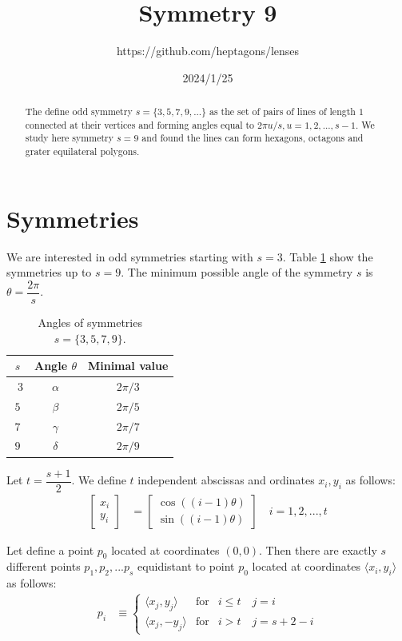 \documentclass[11pt]{article}
\title{Symmetry 9}
\author{https://github.com/heptagons/lenses}
\date{2024/1/25}
\begin{document}
\maketitle
\begin{abstract}
The define odd symmetry $s=\{ 3,5,7,9,... \}$ as the set of pairs of lines of length $1$ connected at their vertices and forming angles equal to $2\pi u/s, u = 1,2,...,s-1$. We study here symmetry $s=9$ and found the lines can form hexagons, octagons and grater equilateral polygons.
\end{abstract}

\section{Symmetries}

We are interested in odd symmetries starting with $s=3$. Table \ref{tbl:symm} show the symmetries up to $s=9$. The minimum possible angle of the symmetry $s$ is $\theta = \dfrac{2\pi}s$. 

\begin{table}[H]
\begin{center}
\begin{tabular}{|c|c c|}
\hline
$s$ & Angle $\theta$ & Minimal value \\ \hline\
$3$ & $\alpha$ & $2\pi/3$ \\ \hline
$5$ & $\beta$  & $2\pi/5$ \\ \hline
$7$ & $\gamma$ & $2\pi/7$ \\ \hline
$9$ & $\delta$ & $2\pi/9$ \\ \hline
\end{tabular}
\caption{Angles of symmetries $s=\{3,5,7,9\}$.} 
\label{tbl:symm}
\end{center}
\end{table}

Let $t = \dfrac{s+1}2$. We define $t$ independent abscissas and ordinates $x_i, y_i$ as follows:
\begin{align}
\left[ \begin{array}{c} x_i \\ y_i \end{array} \right] &= 
\left[ \begin{array}{c} \cos((i-1)\theta) \\ \sin((i-1)\theta) \end{array} \right]
 \quad i = 1,2,...,t \label{eq:pairs}
\end{align}

Let define a point $p_0$ located at coordinates $(0,0)$. Then there are exactly $s$ different points $p_1, p_2, ... p_s$  equidistant to point $p_0$ located at coordinates $\langle x_i,y_i \rangle$ as follows:
\begin{align}
p_i &\equiv \left\{ \begin{array}{ccl}
 \langle x_j,y_j\rangle & \mbox{for} & i \leq t  \quad j = i\\
 \langle x_j, -y_j\rangle & \mbox{for} & i > t \quad j = s+2-i
 \end{array}\right. \label{eq:coords}
\end{align}
\end{document}
